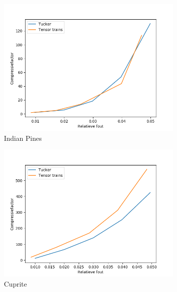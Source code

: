 \begin{figure}[H]
\centering
\begin{subfigure}{0.48\textwidth}
  \centering
  \includegraphics[width=\linewidth]{images/tensor_trains_st_hosvd_results_Indian_Pines.png}
  \caption{Indian Pines}
\end{subfigure}
\begin{subfigure}{0.48\textwidth}
  \centering
  \includegraphics[width=\linewidth]{images/tensor_trains_st_hosvd_results_Cuprite.png}
  \caption{Cuprite}
\end{subfigure}
\\
\begin{subfigure}{0.48\textwidth}
  \centering

\end{subfigure}
\end{figure}
